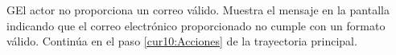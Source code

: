   \begin{UCtrayectoriaA}{G}{El actor no proporciona un correo válido.}
    \UCpaso[\UCsist] Muestra el mensaje  en la pantalla  indicando que el correo electrónico proporcionado no cumple con un formato válido.
	    \UCpaso Continúa en el paso \ref{cur10:Acciones} de la trayectoria principal.
 \end{UCtrayectoriaA}